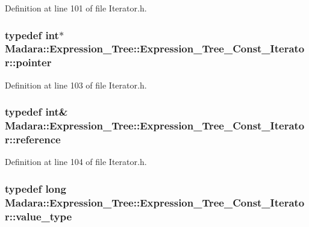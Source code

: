 Definition at line 101 of file Iterator.h.

\hypertarget{classMadara_1_1Expression__Tree_1_1Expression__Tree__Const__Iterator_a22ed6a40941932495749065d275a0d49}{
\subsubsection[{pointer}]{\setlength{\rightskip}{0pt plus 5cm}typedef int$\ast$ {\bf Madara::Expression\_\-Tree::Expression\_\-Tree\_\-Const\_\-Iterator::pointer}}}
\label{db/d5c/classMadara_1_1Expression__Tree_1_1Expression__Tree__Const__Iterator_a22ed6a40941932495749065d275a0d49}


Definition at line 103 of file Iterator.h.

\hypertarget{classMadara_1_1Expression__Tree_1_1Expression__Tree__Const__Iterator_a64aac480c78275a3ac8ed1fb7b062566}{
\subsubsection[{reference}]{\setlength{\rightskip}{0pt plus 5cm}typedef int\& {\bf Madara::Expression\_\-Tree::Expression\_\-Tree\_\-Const\_\-Iterator::reference}}}
\label{db/d5c/classMadara_1_1Expression__Tree_1_1Expression__Tree__Const__Iterator_a64aac480c78275a3ac8ed1fb7b062566}


Definition at line 104 of file Iterator.h.

\hypertarget{classMadara_1_1Expression__Tree_1_1Expression__Tree__Const__Iterator_a03a54ac5cdb47a9db29d4743aebfb545}{
\subsubsection[{value\_\-type}]{\setlength{\rightskip}{0pt plus 5cm}typedef long {\bf Madara::Expression\_\-Tree::Expression\_\-Tree\_\-Const\_\-Iterator::value\_\-type}}}
\label{db/d5c/classMadara_1_1Expression__Tree_1_1Expression__Tree__Const__Iterator_a03a54ac5cdb47a9db29d4743aebfb545}


